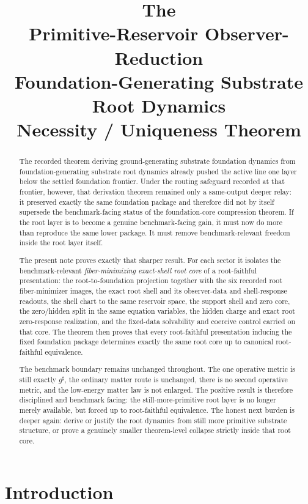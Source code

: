 \documentclass[11pt]{article}
\title{\textbf{The \TheoryName{}}\\[0.4em]
\large Primitive-Reservoir Observer-Reduction\\
\large Foundation-Generating Substrate Root Dynamics\\
\large Necessity / Uniqueness Theorem}
\author{}
\date{}
\newcommand{\CompletedMetric}{g^{\sharp}}
\begin{document}
\maketitle

\begin{abstract}
The recorded theorem deriving ground-generating substrate foundation dynamics from foundation-generating substrate root dynamics already pushed the active line one layer below the settled foundation frontier. Under the routing safeguard recorded at that frontier, however, that derivation theorem remained only a same-output deeper relay: it preserved exactly the same foundation package and therefore did not by itself supersede the benchmark-facing status of the foundation-core compression theorem. If the root layer is to become a genuine benchmark-facing gain, it must now do more than reproduce the same lower package. It must remove benchmark-relevant freedom inside the root layer itself.

The present note proves exactly that sharper result. For each sector it isolates the benchmark-relevant \emph{fiber-minimizing exact-shell root core} of a root-faithful presentation: the root-to-foundation projection together with the six recorded root fiber-minimizer images, the exact root shell and its observer-data and shell-response readouts, the shell chart to the same reservoir space, the support shell and zero core, the zero/hidden split in the same equation variables, the hidden charge and exact root zero-response realization, and the fixed-data solvability and coercive control carried on that core. The theorem then proves that every root-faithful presentation inducing the fixed foundation package determines exactly the same root core up to canonical root-faithful equivalence.

The benchmark boundary remains unchanged throughout. The one operative metric is still exactly \(\CompletedMetric\), the ordinary matter route is unchanged, there is no second operative metric, and the low-energy matter law is not enlarged. The positive result is therefore disciplined and benchmark facing: the still-more-primitive root layer is no longer merely available, but forced up to root-faithful equivalence. The honest next burden is deeper again: derive or justify the root dynamics from still more primitive substrate structure, or prove a genuinely smaller theorem-level collapse strictly inside that root core.
\end{abstract}

\section{Introduction}
\end{document}
